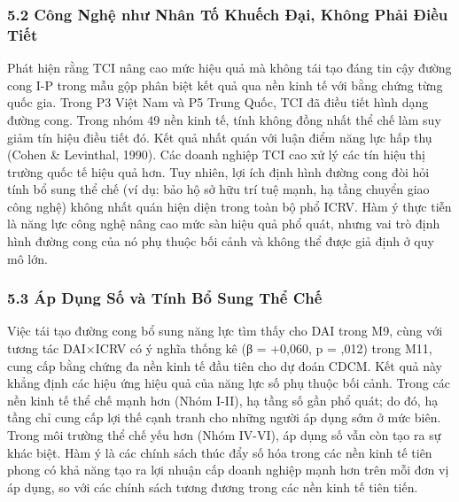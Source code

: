 \documentclass[12pt,a4paper]{article}
\begin{document}
\hypertarget{52-cuxf4ng-nghux1ec7-nhux1b0-nhuxe2n-tux1ed1-khuux1ebfch-ux111ux1ea1i-khuxf4ng-phux1ea3i-ux111iux1ec1u-tiux1ebft}{%
\subsubsection{5.2 Công Nghệ như Nhân Tố Khuếch Đại, Không Phải Điều
Tiết}\label{52-cuxf4ng-nghux1ec7-nhux1b0-nhuxe2n-tux1ed1-khuux1ebfch-ux111ux1ea1i-khuxf4ng-phux1ea3i-ux111iux1ec1u-tiux1ebft}}

Phát hiện rằng TCI nâng cao mức hiệu quả mà không tái tạo đáng tin cậy
đường cong I-P trong mẫu gộp phân biệt kết quả qua nền kinh tế với bằng
chứng từng quốc gia. Trong P3 Việt Nam và P5 Trung Quốc, TCI đã điều
tiết hình dạng đường cong. Trong nhóm 49 nền kinh tế, tính không đồng
nhất thể chế làm suy giảm tín hiệu điều tiết đó. Kết quả nhất quán với
luận điểm năng lực hấp thụ (Cohen \& Levinthal, 1990). Các doanh nghiệp
TCI cao xử lý các tín hiệu thị trường quốc tế hiệu quả hơn. Tuy nhiên,
lợi ích định hình đường cong đòi hỏi tính bổ sung thể chế (ví dụ: bảo hộ
sở hữu trí tuệ mạnh, hạ tầng chuyển giao công nghệ) không nhất quán hiện
diện trong toàn bộ phổ ICRV. Hàm ý thực tiễn là năng lực công nghệ nâng
cao mức sàn hiệu quả phổ quát, nhưng vai trò định hình đường cong của nó
phụ thuộc bối cảnh và không thể được giả định ở quy mô lớn.

\hypertarget{53-uxe1p-dux1ee5ng-sux1ed1-vuxe0-tuxednh-bux1ed5-sung-thux1ec3-chux1ebf}{%
\subsubsection{5.3 Áp Dụng Số và Tính Bổ Sung Thể
Chế}\label{53-uxe1p-dux1ee5ng-sux1ed1-vuxe0-tuxednh-bux1ed5-sung-thux1ec3-chux1ebf}}

Việc tái tạo đường cong bổ sung năng lực tìm thấy cho DAI trong M9, cùng
với tương tác DAI×ICRV có ý nghĩa thống kê (β = +0,060, p = ,012) trong
M11, cung cấp bằng chứng đa nền kinh tế đầu tiên cho dự đoán CDCM. Kết
quả này khẳng định các hiệu ứng hiệu quả của năng lực số phụ thuộc bối
cảnh. Trong các nền kinh tế thể chế mạnh hơn (Nhóm I-II), hạ tầng số gần
phổ quát; do đó, hạ tầng chỉ cung cấp lợi thế cạnh tranh cho những người
áp dụng sớm ở mức biên. Trong môi trường thể chế yếu hơn (Nhóm IV-VI),
áp dụng số vẫn còn tạo ra sự khác biệt. Hàm ý là các chính sách thúc đẩy
số hóa trong các nền kinh tế tiên phong có khả năng tạo ra lợi nhuận cấp
doanh nghiệp mạnh hơn trên mỗi đơn vị áp dụng, so với các chính sách
tương đương trong các nền kinh tế tiên tiến.
\end{document}

